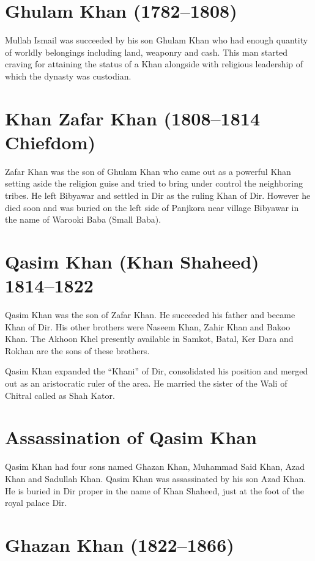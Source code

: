 \documentclass[twoside,openright]{book}
\begin{document}
\section{Ghulam Khan (1782--1808)}

Mullah Ismail was succeeded by his son Ghulam Khan who had enough quantity of
worldly belongings including land, weaponry and cash. This man started craving
for attaining the status of a Khan alongside with religious leadership of which
the dynasty was custodian.

\section{Khan Zafar Khan (1808--1814 Chiefdom)}

Zafar Khan was the son of Ghulam Khan who came out as a powerful Khan setting
aside the religion guise and tried to bring under control the neighboring
tribes. He left Bibyawar and settled in Dir as the ruling Khan of Dir. However
he died soon and was buried on the left side of Panjkora near village Bibyawar
in the name of Warooki Baba (Small Baba).

\section{Qasim Khan (Khan Shaheed) 1814--1822}

Qasim Khan was the son of Zafar Khan. He succeeded his father
and became Khan of Dir. His other brothers were Naseem Khan, Zahir
Khan and Bakoo Khan. The Akhoon Khel presently available in
Samkot, Batal, Ker Dara and Rokhan are the sons of these brothers.

Qasim Khan expanded the ``Khani'' of Dir, consolidated his
position and merged out as an aristocratic ruler of the area. He
married the sister of the Wali of Chitral called as Shah Kator.

\section{Assassination of Qasim Khan}

Qasim Khan had four sons named Ghazan Khan, Muhammad Said Khan, Azad Khan and
Sadullah Khan. Qasim Khan was assassinated by his son Azad Khan. He is buried in
Dir proper in the name of Khan Shaheed, just at the foot of the royal palace
Dir.

\section{Ghazan Khan (1822--1866)}
\end{document}
